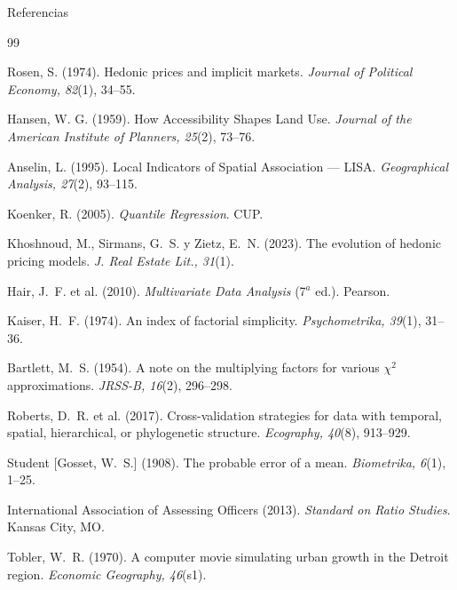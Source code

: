 \documentclass[aspectratio=169,11pt]{beamer}
\begin{document}
\appendix
\begin{frame}[allowframebreaks]{Referencias}
  \scriptsize
  \begin{thebibliography}{99}

    Rosen, S. (1974). Hedonic prices and implicit markets.
    \textit{Journal of Political Economy, 82}(1), 34--55.

    Hansen, W. G. (1959). How Accessibility Shapes Land Use.
    \textit{Journal of the American Institute of Planners, 25}(2), 73--76.

    Anselin, L. (1995). Local Indicators of Spatial Association --- LISA.
    \textit{Geographical Analysis, 27}(2), 93--115.

    Koenker, R. (2005). \textit{Quantile Regression}. CUP.

    Khoshnoud, M., Sirmans, G.~S. y Zietz, E.~N. (2023). The evolution
    of hedonic pricing models. \textit{J. Real Estate Lit., 31}(1).

    Hair, J.~F. et al. (2010). \textit{Multivariate Data Analysis}
    (7$^a$ ed.). Pearson.

    Kaiser, H.~F. (1974). An index of factorial simplicity.
    \textit{Psychometrika, 39}(1), 31--36.

    Bartlett, M.~S. (1954). A note on the multiplying factors for various
    $\chi^2$ approximations. \textit{JRSS-B, 16}(2), 296--298.

    Roberts, D.~R. et al. (2017). Cross-validation strategies for data
    with temporal, spatial, hierarchical, or phylogenetic structure.
    \textit{Ecography, 40}(8), 913--929.

    Student [Gosset, W.~S.] (1908). The probable error of a mean.
    \textit{Biometrika, 6}(1), 1--25.

    International Association of Assessing Officers (2013).
    \textit{Standard on Ratio Studies}. Kansas City, MO.

    Tobler, W.~R. (1970). A computer movie simulating urban growth
    in the Detroit region. \textit{Economic Geography, 46}(s1).


\end{thebibliography}
\end{frame}
\end{document}
